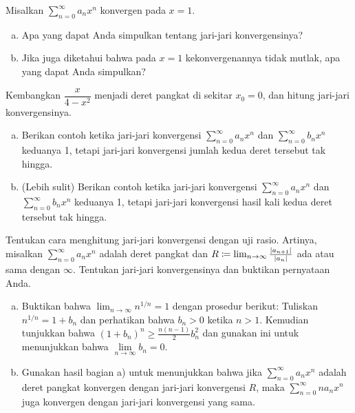 \begin{exercise}
Misalkan $\sum_{n=0}^\infty a_n x^n$ konvergen pada $x=1$.
\begin{enumerate}[a)]
\item
Apa yang dapat Anda simpulkan tentang jari-jari konvergensinya?
\item
Jika juga diketahui bahwa pada $x=1$ kekonvergenannya tidak mutlak,
apa yang dapat Anda simpulkan?
\end{enumerate}
\end{exercise}

\begin{exercise}
Kembangkan
$\dfrac{x}{4-x^2}$ menjadi deret pangkat di sekitar $x_0 = 0$,
dan hitung jari-jari konvergensinya.
\end{exercise}

\begin{exercise}
\leavevmode
\begin{enumerate}[a)]
\item
Berikan contoh ketika jari-jari konvergensi $\sum_{n=0}^\infty a_n x^n$ dan
$\sum_{n=0}^\infty b_n x^n$ keduanya 1, tetapi jari-jari konvergensi
jumlah kedua deret tersebut tak hingga.
\item
(Lebih sulit)
Berikan contoh ketika jari-jari konvergensi $\sum_{n=0}^\infty a_n x^n$ dan
$\sum_{n=0}^\infty b_n x^n$ keduanya 1, tetapi jari-jari konvergensi
hasil kali kedua deret tersebut tak hingga.
\end{enumerate}
\end{exercise}

\begin{exercise}
Tentukan cara menghitung jari-jari konvergensi dengan uji rasio.
Artinya, misalkan $\sum_{n=0}^\infty a_n x^n$ adalah deret pangkat dan
$R \coloneqq \lim_{n\to\infty} \frac{\lvert {a_{n+1}} \rvert}{\lvert {a_n} \rvert}$ ada atau sama dengan $\infty$.
Tentukan jari-jari konvergensinya dan buktikan pernyataan Anda.
\end{exercise}

\begin{samepage}
\begin{exercise}
\leavevmode
\begin{enumerate}[a)]
\item
Buktikan bahwa $\lim_{n\to\infty} n^{1/n} = 1$ dengan prosedur berikut: Tuliskan $n^{1/n} = 1+b_n$ dan
perhatikan bahwa $b_n > 0$ ketika $n > 1$.  Kemudian tunjukkan bahwa ${(1+b_n)}^n \geq
\frac{n(n-1)}{2}b_n^2$ dan gunakan ini untuk menunjukkan bahwa $\lim\limits_{n\to\infty} b_n = 0$.
\item
Gunakan hasil bagian a) untuk menunjukkan bahwa
jika $\sum_{n=0}^\infty a_n x^n$ adalah deret pangkat konvergen dengan jari-jari konvergensi $R$,
maka $\sum_{n=0}^\infty n a_n x^n$ juga konvergen dengan jari-jari konvergensi yang sama.
\end{enumerate}
\end{exercise}
\end{samepage}

